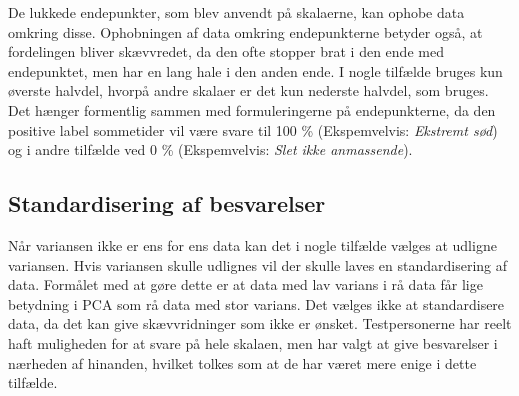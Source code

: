 %
De lukkede endepunkter, som blev anvendt på skalaerne, kan ophobe data omkring disse. Ophobningen af data omkring endepunkterne betyder også, at fordelingen bliver skævvredet, da den ofte stopper brat i den ende med endepunktet, men har en lang hale i den anden ende.  \blankline
%
I nogle tilfælde bruges kun øverste halvdel, hvorpå andre skalaer er det kun nederste halvdel, som bruges. Det hænger formentlig sammen med formuleringerne på endepunkterne, da den positive label sommetider vil være svare til 100 \% (Ekspemvelvis: \textit{Ekstremt sød}) og i andre tilfælde ved 0 \% (Ekspemvelvis: \textit{Slet ikke anmassende}).


\subsection{Standardisering af besvarelser}
Når variansen ikke er ens for ens data kan det i nogle tilfælde vælges at udligne variansen. Hvis variansen skulle udlignes vil der skulle laves en standardisering af data. Formålet med at gøre dette er at data med lav varians i rå data får lige betydning i PCA som rå data med stor varians. \blankline
%
Det vælges ikke at standardisere data, da det kan give skævvridninger som ikke er ønsket. Testpersonerne har reelt haft muligheden for at svare på hele skalaen, men har valgt at give besvarelser i nærheden af hinanden, hvilket tolkes som at de har været mere enige i dette tilfælde. \blankline

%
